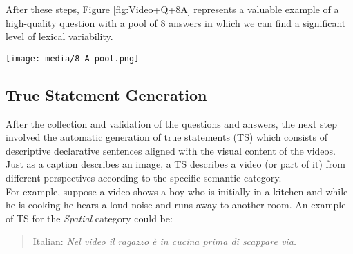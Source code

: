 \begin{table}
  
  \caption{\label{Table: loverlap_TTR_answers}
    Lexical Overlap and TTR Statistics (Type-token) before and after Automatic Sentence Rephrasing with GPT-4o for $19,200$ Answers. Content-words (CW only) statistics are shown only for the After Rephrasing part.
  }
\end{table}
After these steps, Figure \ref{fig:Video+Q+8A} represents a valuable example of a high-quality question with a pool of $8$ answers in which we can find a significant level of lexical variability.
\begin{figure*}[t]
    \centering
  \texttt{[image: media/8-A-pool.png]}
  \caption{Example of a video with a Questions (Implicit category) and its 8-Answers pool.}
  \label{fig:Video+Q+8A}
\end{figure*}

\subsection{True Statement Generation}
\label{subsec:captionGen}

After the collection and validation of the questions and answers, the next step involved the automatic generation of true statements (TS) which consists of descriptive declarative sentences aligned with the visual content of the videos. Just as a caption describes an image, a TS describes a video (or part of it) from different perspectives according to the specific semantic category. \\
For example, suppose a video shows a boy who is initially in a kitchen and while he is cooking he hears a loud noise and runs away to another room. An example of TS for the \textit{Spatial} category could be:
\begin{quote}
    Italian:
    \textit{Nel video il ragazzo è in cucina prima di scappare via.}
\end{quote}

